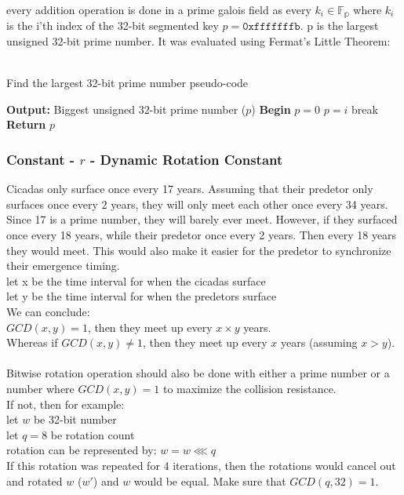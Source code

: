 \documentclass[fleqn, a4paper,12pt]{article}
\begin{document}
every addition operation is done in a prime galois field as every $k_i \in \mathbb{F_p}$ where $k_i$ is the i'th index of the 32-bit segmented key $p = \texttt{0xfffffffb}$. p is the largest unsigned 32-bit prime number. It was evaluated using Fermat's Little Theorem:\\
\\
\begin{algorithm}[H] %
\caption{Find the largest 32-bit prime number pseudo-code}
\begin{algorithmic}[1]  %
\State \textbf{Output:} Biggest unsigned 32-bit prime number ($p$)
\State \textbf{Begin}
\State $p = 0$
		\State $p = i$
		\State break
	\EndIf
\EndFor
\State \textbf{Return} $p$
\end{algorithmic}
\end{algorithm}

\subsubsection{Constant - $r$ - Dynamic Rotation Constant} \label{rotation_constant}

Cicadas only surface once every 17 years. Assuming that their predetor only surfaces once every 2 years, they will only meet each other once every 34 years. Since 17 is a prime number, they will barely ever meet. However, if they surfaced once every 18 years, while their predetor once every 2 years. Then every 18 years they would meet. This would also make it easier for the predetor to synchronize their emergence timing.\\
let x be the time interval for when the cicadas surface \\
let y be the time interval for when the predetors surface \\
We can conclude:\\
$GCD(x,y) = 1$, then they meet up every $x \times y$ years. \\
Whereas if $GCD(x,y) \neq 1$, then they meet up every $x$ years (assuming $x > y$). \\
\\
Bitwise rotation operation should also be done with either a prime number or a number where $GCD(x,y) = 1$ to maximize the collision resistance.\\

If not, then for example: \\
let $w$ be 32-bit number\\
let $q = 8$ be rotation count\\
rotation can be represented by: $w = w \lll q$\\
If this rotation was repeated for 4 iterations, then the rotations would cancel out and rotated $w$ ($w'$) and $w$ would be equal. Make sure that $GCD(q, 32) = 1$. \\
\end{document}
